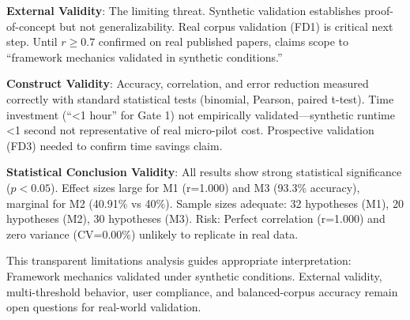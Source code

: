 \textbf{External Validity}: The limiting threat. Synthetic validation establishes proof-of-concept but not generalizability. Real corpus validation (FD1) is critical next step. Until $r \geq 0.7$ confirmed on real published papers, claims scope to ``framework mechanics validated in synthetic conditions.''

\textbf{Construct Validity}: Accuracy, correlation, and error reduction measured correctly with standard statistical tests (binomial, Pearson, paired t-test). Time investment (``<1 hour'' for Gate 1) not empirically validated---synthetic runtime <1 second not representative of real micro-pilot cost. Prospective validation (FD3) needed to confirm time savings claim.

\textbf{Statistical Conclusion Validity}: All results show strong statistical significance ($p < 0.05$). Effect sizes large for M1 (r=1.000) and M3 (93.3\% accuracy), marginal for M2 (40.91\% vs 40\%). Sample sizes adequate: 32 hypotheses (M1), 20 hypotheses (M2), 30 hypotheses (M3). Risk: Perfect correlation (r=1.000) and zero variance (CV=0.00\%) unlikely to replicate in real data.

This transparent limitations analysis guides appropriate interpretation: Framework mechanics validated under synthetic conditions. External validity, multi-threshold behavior, user compliance, and balanced-corpus accuracy remain open questions for real-world validation.
